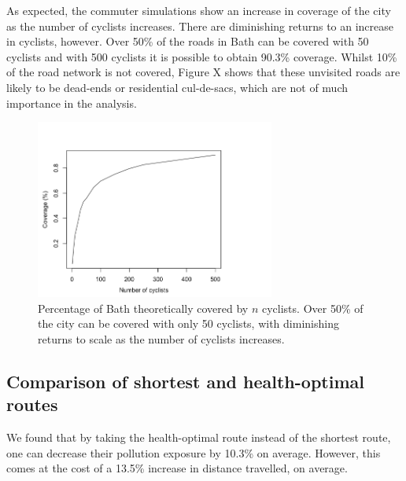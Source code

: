 \documentclass[11pt]{report}
\begin{document}
As expected, the commuter simulations show an increase in coverage of the city as the number of cyclists increases. There are diminishing returns to an increase in cyclists, however. Over 50\% of the roads in Bath can be covered with 50 cyclists and with 500 cyclists it is possible to obtain 90.3\% coverage. Whilst 10\% of the road network is not covered, Figure X shows that these unvisited roads are likely to be dead-ends or residential cul-de-sacs, which are not of much importance in the analysis.


\begin{figure}[!tb]
\centering
\includegraphics[width=0.7\textwidth]{images/coverage}
\caption[Cyclist coverage.]{Percentage of Bath theoretically covered by $n$ cyclists. Over 50\% of the city can be covered with only 50 cyclists, with diminishing returns to scale as the number of cyclists increases.}
\label{fig:coverage}
\end{figure}


\subsection{Comparison of shortest and health-optimal routes}

We found that by taking the health-optimal route instead of the shortest route, one can decrease their pollution exposure by 10.3\% on average. However, this comes at the cost of a 13.5\% increase in distance travelled, on average.
\end{document}
